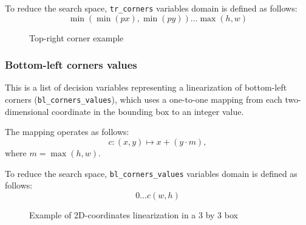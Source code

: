 \documentclass[a4paper,10pt]{article}
\begin{document}
To reduce the search space, \texttt{tr\_corners} variables domain is defined as follows: $$\min({\min({px}), \min({py})}) \dots \max({h, w})$$

\begin{figure}[h]
   \centering
   \caption{Top-right corner example}
\end{figure}

\subsubsection*{Bottom-left corners values} \label{sec:bottom-left-corners-values}
This is a list of decision variables representing a linearization of bottom-left corners (\texttt{bl\_corners\_values}), which uses a one-to-one mapping from each two-dimensional coordinate in the bounding box to an integer value.

The mapping operates as follows:
$$ c: (x,y) \mapsto x+(y\cdot m),$$ where $m = \max{(h,w)}$.

To reduce the search space, \texttt{bl\_corners\_values} variables domain is defined as follows: $$0 \dots c(w, h)$$

\begin{figure}[h]
   \centering
   \caption{Example of 2D-coordinates linearization in a 3 by 3 box}
\end{figure}
\end{document}
